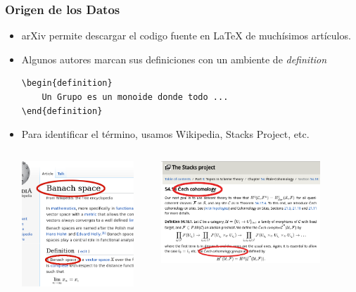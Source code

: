 \documentclass[10pt]{beamer}
\begin{document}
\begin{frame}[fragile]
    \frametitle{Origen de los Datos}
    \begin{itemize}
        \item arXiv permite descargar el codigo fuente en \LaTeX{} de muchísimos artículos.
            \pause
        \item Algunos autores marcan sus definiciones con un ambiente de \emph{definition}
            \begin{verbatim}
\begin{definition}
    Un Grupo es un monoide donde todo ...
\end{definition}
    \end{verbatim}
    \pause
\item Para identificar el término, usamos Wikipedia, Stacks Project, etc.
    \begin{columns}
        \begin{column}{0.4\textwidth}
            \includegraphics[width=0.9\textwidth]{../Images/wiki_thin_banach.png}
        \end{column}
        \pause
        \begin{column}{0.6\textwidth}
            \includegraphics[width=0.8\textwidth]{../Images/stacks_defs.png}

\end{column}
\end{columns}
\end{itemize}
\end{frame}
\end{document}
